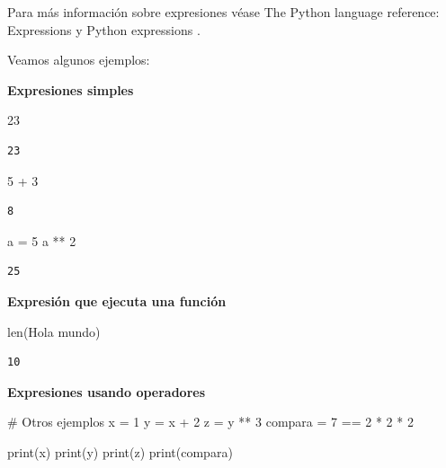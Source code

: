 \documentclass[
  spanish,
  letterpaper,
]{scrbook}
\newenvironment{Shaded}{\begin{snugshade}}{\end{snugshade}}
\newcommand{\BuiltInTok}[1]{\textcolor[rgb]{0.00,0.23,0.31}{#1}}
\newcommand{\CommentTok}[1]{\textcolor[rgb]{0.37,0.37,0.37}{#1}}
\newcommand{\DecValTok}[1]{\textcolor[rgb]{0.68,0.00,0.00}{#1}}
\newcommand{\NormalTok}[1]{\textcolor[rgb]{0.00,0.23,0.31}{#1}}
\newcommand{\OperatorTok}[1]{\textcolor[rgb]{0.37,0.37,0.37}{#1}}
\newcommand{\StringTok}[1]{\textcolor[rgb]{0.13,0.47,0.30}{#1}}
\theoremstyle{definition}
\theoremstyle{remark}
\begin{document}
Para más información sobre expresiones véase The Python language
reference: Expressions y Python expressions .

Veamos algunos ejemplos:

\textbf{Expresiones simples}

\begin{Shaded}
\begin{Highlighting}[]
\DecValTok{23} 
\end{Highlighting}
\end{Shaded}

\begin{verbatim}
23
\end{verbatim}

\begin{Shaded}
\begin{Highlighting}[]
\DecValTok{5} \OperatorTok{+} \DecValTok{3}
\end{Highlighting}
\end{Shaded}

\begin{verbatim}
8
\end{verbatim}

\begin{Shaded}
\begin{Highlighting}[]
\NormalTok{a }\OperatorTok{=} \DecValTok{5}
\NormalTok{a }\OperatorTok{**} \DecValTok{2}
\end{Highlighting}
\end{Shaded}

\begin{verbatim}
25
\end{verbatim}

\textbf{Expresión que ejecuta una función}

\begin{Shaded}
\begin{Highlighting}[]
\BuiltInTok{len}\NormalTok{(}\StringTok{\textquotesingle{}Hola mundo\textquotesingle{}}\NormalTok{) }
\end{Highlighting}
\end{Shaded}

\begin{verbatim}
10
\end{verbatim}

\textbf{Expresiones usando operadores}

\begin{Shaded}
\begin{Highlighting}[]
\CommentTok{\# Otros ejemplos}
\NormalTok{x }\OperatorTok{=} \DecValTok{1}
\NormalTok{y }\OperatorTok{=}\NormalTok{ x }\OperatorTok{+} \DecValTok{2}
\NormalTok{z }\OperatorTok{=}\NormalTok{ y }\OperatorTok{**} \DecValTok{3}
\NormalTok{compara }\OperatorTok{=}  \DecValTok{7} \OperatorTok{==} \DecValTok{2} \OperatorTok{*} \DecValTok{2} \OperatorTok{*} \DecValTok{2}

\BuiltInTok{print}\NormalTok{(x)}
\BuiltInTok{print}\NormalTok{(y)}
\BuiltInTok{print}\NormalTok{(z)}
\BuiltInTok{print}\NormalTok{(compara)}
\end{Highlighting}
\end{Shaded}
\end{document}
